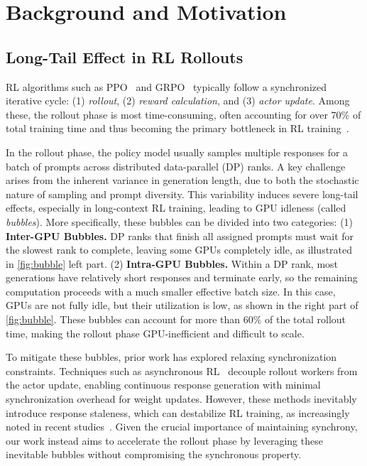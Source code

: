\section{Background and Motivation}

\subsection{Long-Tail Effect in RL Rollouts}
RL algorithms such as PPO~\cite{schulman2017proximal} and GRPO~\cite{guo2025deepseek} typically follow a synchronized iterative cycle: (1) \textit{rollout}, (2) \textit{reward calculation}, and (3) \textit{actor update}. Among these, the rollout phase is most time-consuming, often accounting for over 70\% of total training time and thus becoming the primary bottleneck in RL training~\cite{he2025history_rhyme, hu2025taming}. 

In the rollout phase, the policy model usually samples multiple responses for a batch of prompts across distributed data-parallel (DP) ranks. 
A key challenge arises from the inherent variance in generation length, due to both the stochastic nature of sampling and prompt diversity. This variability induces severe long-tail effects, especially in long-context RL training, leading to GPU idleness (called \textit{bubbles}). More specifically, these bubbles can be divided into two categories: (1) \textbf{Inter-GPU Bubbles.} DP ranks that finish all assigned prompts must wait for the slowest rank to complete, leaving some GPUs completely idle, as illustrated in \autoref{fig:bubble} left part. (2) \textbf{Intra-GPU Bubbles.} Within a DP rank, most generations have relatively short responses and terminate early, so the remaining computation proceeds with a much smaller effective batch size. In this case, GPUs are not fully idle, but their utilization is low, as shown in the right part of \autoref{fig:bubble}. These bubbles can account for more than $60\%$ of the total rollout time, making the rollout phase GPU-inefficient and difficult to scale.

To mitigate these bubbles, prior work has explored relaxing synchronization constraints. Techniques such as asynchronous RL~\cite{fu2025areal} decouple rollout workers from the actor update, enabling continuous response generation with minimal synchronization overhead for weight updates. However, these methods inevitably introduce response staleness, which can destabilize RL training, as increasingly noted in recent studies~\cite{xi2026jet, qi2025defeating, liuspeed}. Given the crucial importance of maintaining synchrony, our work instead aims to accelerate the rollout phase by leveraging these inevitable bubbles without compromising the synchronous property.

